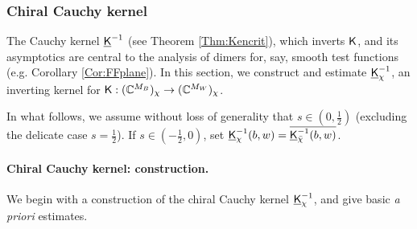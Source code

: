 \documentclass[10pt]{article}
\newcommand{\C}{\mathbb{C}}
\newcommand{\rK}{{\sf K}}
\newcommand{\uK}{{\underline {\sf K}}}
\begin{document}
\subsubsection{Chiral Cauchy kernel}

The Cauchy kernel $\uK^{-1}$ (see Theorem \ref{Thm:Kencrit}), which inverts $\rK$, and its asymptotics are central to the analysis of dimers for, say, smooth test functions (e.g. Corollary \ref{Cor:FFplane}). In this section, we construct and estimate $\uK_\chi^{-1}$, an inverting kernel for $\rK:(\C^{M_B})_\chi\rightarrow(\C^{M_W})_\chi$.

In what follows, we assume without loss of generality that $s\in (0,\frac 12)$ (excluding the delicate case $s=\frac 12$). If $s\in(-\frac 12,0)$, set $\uK_\chi^{-1}(b,w)=\overline{\uK^{-1}_{\bar\chi}(b,w)}$.


\paragraph{Chiral Cauchy kernel: construction.\\}

We begin with a construction of the chiral Cauchy kernel $\uK_\chi^{-1}$, and give basic {\em a priori} estimates.
\end{document}
